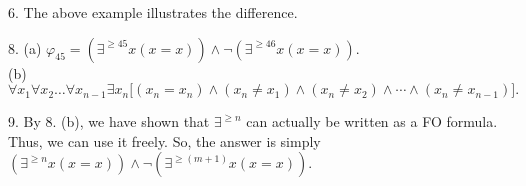 \documentclass{article}
\begin{document}
\hrulefill

6. The above example illustrates the difference.

\hrulefill

8. (a) $\varphi_{45} = (\exists^{\ge45}x (x = x)) \wedge \neg(\exists^{\ge46}x(x = x)).$\\

(b) $\forall x_1 \forall x_2 \ldots \forall x_{n-1} \exists x_n \big[(x_n = x_n) \wedge (x_n \neq x_1) \wedge (x_n \neq x_{2}) \wedge \cdots \wedge (x_n \neq x_{n-1})\big].$\\


\hrulefill

9. By 8. (b), we have shown that $\exists^{\ge n}$ can actually be written as a FO formula. Thus, we can use it freely. So, the answer is simply $(\exists^{\ge n}x (x = x)) \wedge \neg(\exists^{\ge (m+1)}x(x = x)).$
\end{document}
